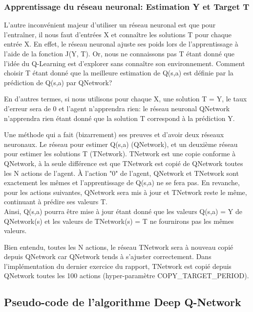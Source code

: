 \documentclass[11pt,a4paper]{report}
\begin{document}
  \subsubsection{Apprentissage du réseau neuronal: Estimation Y et Target T}
  
    \par L'autre inconvénient majeur d'utiliser un réseau neuronal est que pour l’entraîner, il nous faut d'entrées X et connaître les solutions T pour chaque entrée X. En effet, le réseau neuronal ajuste ses poids lors de l'apprentissage à l'aide de la fonction J(Y, T). Or, nous ne connaissons pas T étant donné que l'idée du Q-Learning est d'explorer sans connaître son environnement. Comment choisir T étant donné que la meilleure estimation de Q(s,a) est définie par la prédiction de Q(s,a) par QNetwork? 
    
    \par En d'autres termes, si nous utilisons pour chaque X, une solution T = Y, le taux d'erreur sera de 0 et l'agent n'apprendra rien: le réseau neuronal QNetwork n'apprendra rien étant donné que la solution T correspond à la prédiction Y. 
    
    \par Une méthode qui a fait (bizarrement) ses preuves et d'avoir deux réseaux neuronaux. Le réseau pour estimer Q(s,a) (QNetwork), et un deuxième réseau pour estimer les solutions T (TNetwork). TNetwork est une copie conforme à QNetwork, à la seule différence est que TNetwork est copié de QNetwork toutes les N actions de l'agent. À l'action "0" de l'agent, QNetwork et TNetwork sont exactement les mêmes et l'apprentissage de Q(s,a) ne se fera pas. En revanche, pour les actions suivantes, QNetwork sera mis à jour et TNetwork reste le même, continuant à prédire ses valeurs T. \\
    Ainsi, Q(s,a) pourra être mise à jour étant donné que les valeurs Q(s,a) = Y de QNetwork(s) et les valeurs de TNetwork(s) = T ne fournirons pas les mêmes valeurs. 
    
    \par Bien entendu, toutes les N actions, le réseau TNetwork sera à nouveau copié depuis QNetwork car QNetwork tends à s'ajuster correctement. Dans l'implémentation du dernier exercice du rapport, TNetwork est copié depuis QNetwork toutes les 100 actions (hyper-paramètre COPY\_TARGET\_PERIOD). 
    
   \subsection{Pseudo-code de l'algorithme Deep Q-Network} 
   
\end{document}
